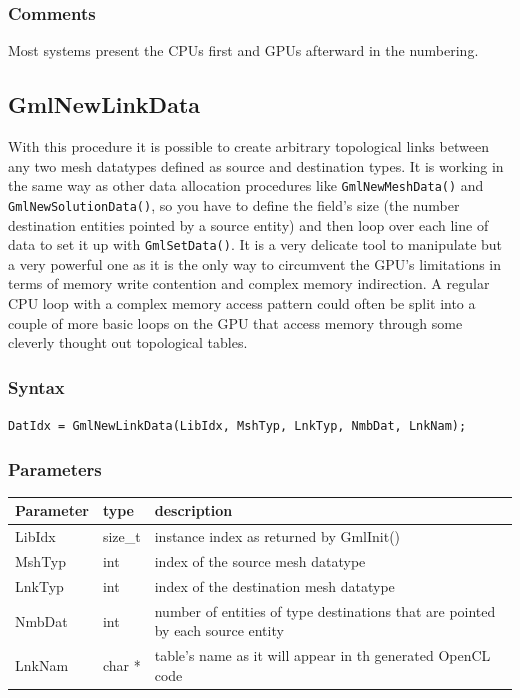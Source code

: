 \documentclass[a4paper,12pt]{article}
\begin{document}
\subsubsection*{Comments}
Most systems present the CPUs first and GPUs afterward in the numbering.


\subsection{GmlNewLinkData}
With this procedure it is possible to create arbitrary topological links between any two mesh datatypes defined as source and destination types. It is working in the same way as other data allocation procedures like {\tt GmlNewMeshData()} and {\tt GmlNewSolutionData()}, so you have to define the field's size (the number destination entities pointed by a source entity) and then loop over each line of data to set it up with {\tt GmlSetData()}. It is a very delicate tool to manipulate but a very powerful one as it is the only way to circumvent the GPU's limitations in terms of memory write contention and complex memory indirection. A regular CPU loop with a complex memory access pattern could often be split into a couple of more basic loops on the GPU that access memory through some cleverly thought out topological tables.

\subsubsection*{Syntax}
{\tt DatIdx = GmlNewLinkData(LibIdx, MshTyp, LnkTyp, NmbDat, LnkNam);}

\subsubsection*{Parameters}
\begin{tabular}{|m{2cm}|m{1.5cm}|m{10.5cm}|}
\hline
Parameter  & type    & description \\
\hline
LibIdx     & size\_t & instance index as returned by GmlInit() \\
\hline
MshTyp     & int     & index of the source mesh datatype \\
\hline
LnkTyp     & int     & index of the destination mesh datatype \\
\hline
NmbDat     & int     & number of entities of type destinations that are pointed by each source entity \\
\hline
LnkNam     & char *  & table's name as it will appear in th generated OpenCL code \\
\hline
\end{tabular}
\end{document}
